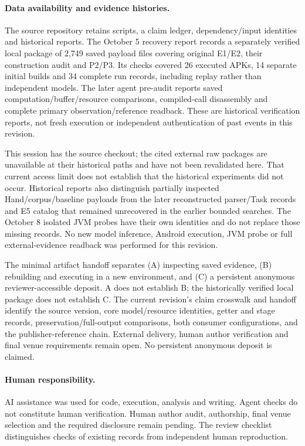 \documentclass[10pt,conference]{IEEEtran}
\begin{document}
\paragraph{Data availability and evidence histories.}
The source repository retains scripts, a claim ledger, dependency/input identities and historical reports. The October 5 recovery report records a separately verified local package of 2,749 saved payload files covering original E1/E2, their construction audit and P2/P3. Its checks covered 26 executed APKs, 14 separate initial builds and 34 complete run records, including replay rather than independent models. The later agent pre-audit reports saved computation/buffer/resource comparisons, compiled-call disassembly and complete primary observation/reference readback. These are historical verification reports, not fresh execution or independent authentication of past events in this revision.

This session has the source checkout; the cited external raw packages are unavailable at their historical paths and have not been revalidated here. That current access limit does not establish that the historical experiments did not occur. Historical reports also distinguish partially inspected Hand/corpus/baseline payloads from the later reconstructed parser/Task records and E5 catalog that remained unrecovered in the earlier bounded searches. The October 8 isolated JVM probes have their own identities and do not replace those missing records. No new model inference, Android execution, JVM probe or full external-evidence readback was performed for this revision.

The minimal artifact handoff separates (A) inspecting saved evidence, (B) rebuilding and executing in a new environment, and (C) a persistent anonymous reviewer-accessible deposit. A does not establish B; the historically verified local package does not establish C. The current revision's claim crosswalk and handoff identify the source version, core model/resource identities, getter and stage records, preservation/full-output comparisons, both consumer configurations, and the publisher-reference chain. External delivery, human author verification and final venue requirements remain open. No persistent anonymous deposit is claimed.

\paragraph{Human responsibility.}
AI assistance was used for code, execution, analysis and writing. Agent checks do not constitute human verification. Human author audit, authorship, final venue selection and the required disclosure remain pending. The review checklist distinguishes checks of existing records from independent human reproduction.
\end{document}
